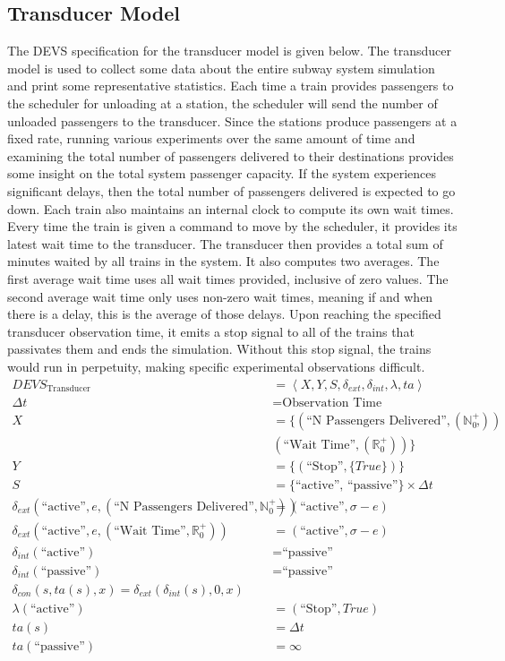 \subsection{Transducer Model}
The DEVS specification for the transducer model is given below.  The transducer model is used to collect some data about the entire subway system simulation and print some representative statistics. Each time a train provides passengers to the scheduler for unloading at a station, the scheduler will send the number of unloaded passengers to the transducer.  Since the stations produce passengers at a fixed rate, running various experiments over the same amount of time and examining the total number of passengers delivered to their destinations provides some insight on the total system passenger capacity.  If the system experiences significant delays, then the total number of passengers delivered is expected to go down.  Each train also maintains an internal clock to compute its own wait times. Every time the train is given a command to move by the scheduler, it provides its latest wait time to the transducer.  The transducer then provides a total sum of minutes waited by all trains in the system.  It also computes two averages.  The first average wait time uses all wait times provided, inclusive of zero values.  The second average wait time only uses non-zero wait times, meaning if and when there is a delay, this is the average of those delays.  Upon reaching the specified transducer observation time, it emits a stop signal to all of the trains that passivates them and ends the simulation.  Without this stop signal, the trains would run in perpetuity, making specific experimental observations difficult.
\begin{align*} DEVS_{\textrm{Transducer}} &= \left<X,Y,S,\delta_{ext},\delta_{int},\lambda,ta\right> \\
\Delta t &= \text{Observation Time} \\
X &= \lbrace (\text{``N Passengers Delivered''},(\mathbb{N}_0^+)), \\
 & (\text{``Wait Time''},(\mathbb{R}_0^+))\rbrace \\
Y &= \lbrace(\text{``Stop''},\lbrace True\rbrace)\rbrace \\
S &= \lbrace\text{``active'', ``passive''}\rbrace\times\Delta t \\
\delta_{ext}(\text{``active''},e,(\text{``N Passengers Delivered''},\mathbb{N}_0^+)) &= (\text{``active''},\sigma-e) \\
\delta_{ext}(\text{``active''},e,(\text{``Wait Time''},\mathbb{R}_0^+)) &= (\text{``active''},\sigma-e) \\
\delta_{int}(\text{``active''}) &= \text{``passive''} \\
\delta_{int}(\text{``passive''}) &= \text{``passive''} \\
\delta_{con}(s,ta(s),x) = \delta_{ext}(\delta_{int}(s),0,x) \\
\lambda(\text{``active''}) &= (\text{``Stop''},True) \\
ta(s) &= \Delta t \\
ta(\text{``passive''}) &= \infty \\
\end{align*}

